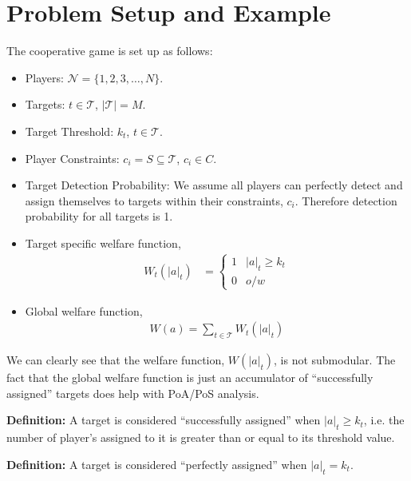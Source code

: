 \documentclass[defaultstyle,12pt]{proposal}
\def\Pl{\mathcal{N}}  %
\def\Ta{\mathcal{T}}  %
\begin{document}
\section{Problem Setup and Example}
The cooperative game is set up as follows:
\begin{itemize}
	\item Players: $\Pl = \{1,2,3,\ldots, N\}$.
	\item Targets: $t \in \Ta$, $|\Ta| = M$.
	\item Target Threshold: $k_t$, $t \in \Ta$.
	\item Player Constraints: $c_i = S \subseteq \Ta$, $c_i \in C$.
	\item Target Detection Probability: We assume all players can perfectly detect and assign themselves to targets within their constraints, $c_i$. Therefore detection probability for all targets is 1.
	\item Target specific welfare function, 
\begin{align}
	W_t(|a|_t) & = \left\{
	\begin{array}{ll}
		1 & |a|_t \geq k_t\\
		0 & o/w
	\end{array}\right.\label{eq:wf}
\end{align}
	\item Global welfare function,
\begin{align}
	W(a) = \sum\limits_{t \in \Ta} W_t(|a|_t)\label{eq:gwf}
\end{align}
\end{itemize}
We can clearly see that the welfare function, $W(|a|_t)$, is not submodular. The fact that the global welfare function is just an accumulator of ``successfully assigned'' targets does help with PoA/PoS analysis.

\textbf{Definition:} A target is considered ``successfully assigned'' when $|a|_t \geq k_t$, i.e. the number of player's assigned to it is greater than or equal to its threshold value.

\textbf{Definition:} A target is considered ``perfectly assigned'' when $|a|_t = k_t$.
\end{document}
